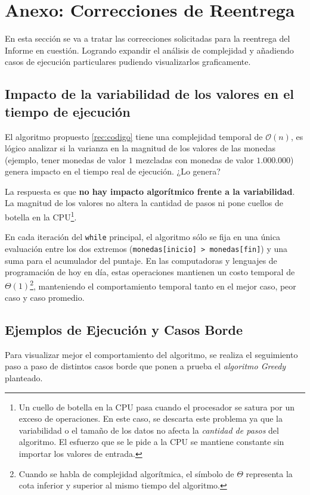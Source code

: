 \section{Anexo: Correcciones de Reentrega}

En esta sección se va a tratar las correcciones solicitadas para la reentrega del Informe en cuestión. Logrando expandir el análisis de complejidad y añadiendo casos de ejecución particulares pudiendo visualizarlos graficamente.


\subsection{Impacto de la variabilidad de los valores en el tiempo de ejecución}

El algoritmo propuesto \ref{rec:codigo} tiene una complejidad temporal de $\mathcal{O}(n)$, es lógico analizar si la varianza en la magnitud de los valores de las monedas (ejemplo, tener monedas de valor $1$ mezcladas con monedas de valor $1.000.000$) genera impacto en el tiempo real de ejecución. ¿Lo genera?

La respuesta es que \textbf{no hay impacto algorítmico frente a la variabilidad}. La magnitud de los valores no altera la cantidad de pasos ni pone cuellos de botella en la CPU\footnote{Un cuello de botella en la CPU pasa cuando el procesador se satura por un exceso de operaciones. En este caso, se descarta este problema ya que la variabilidad o el tamaño de los datos no afecta la \textit{cantidad de pasos} del algoritmo. El esfuerzo que se le pide a la CPU se mantiene constante sin importar los valores de entrada.}.

En cada iteración del \verb|while| principal, el algoritmo sólo se fija en una única evaluación entre los dos extremos (\verb|monedas[inicio] > monedas[fin]|) y una suma para el acumulador del puntaje. En las computadoras y lenguajes de programación de hoy en día, estas operaciones mantienen un costo temporal de $\Theta(1)$\footnote{Cuando se habla de complejidad algorítmica, el símbolo de $\Theta$ representa la cota inferior y superior al mismo tiempo del algoritmo.}, manteniendo el comportamiento temporal tanto en el mejor caso, peor caso y caso promedio.

\subsection{Ejemplos de Ejecución y Casos Borde}

Para visualizar mejor el comportamiento del algoritmo, se realiza el seguimiento paso a paso de distintos casos borde que ponen a prueba el \textit{algoritmo Greedy} planteado.

